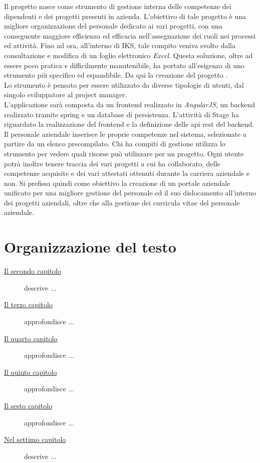 Il progetto \myTitle{} nasce come strumento di gestione interna delle competenze dei dipendenti e dei progetti presenti in azienda. L'obiettivo di tale progetto è una migliore organizzazione del personale dedicato ai vari progetti, con una conseguente maggiore efficienza ed efficacia nell'assegnazione dei ruoli nei processi ed attività. Fino ad ora, all'interno di IKS, tale compito veniva svolto dalla consultazione e modifica di un foglio elettronico \emph{Excel}. Questa soluzione, oltre ad essere poco pratica e difficilmente manutenibile, ha portato all'esigenza di uno strumento più specifico ed espandibile. Da qui la creazione del progetto \myTitle{}.\\
Lo strumento \myTitle{} è pensato per essere utilizzato da diverse tipologie di utenti, dal singolo sviluppatore al project manager.\\
L'applicazione sarà composta da un \gls{frontend} realizzato in \emph{AngularJS}, un \gls{backend} realizzato tramite \gls{spring} e un database di persistenza. L'attività di Stage ha riguardato la realizzazione del frontend e la definizione delle \gls{api} \gls{rest} del backend.\\
Il personale aziendale inserisce le proprie competenze nel sistema, selezionate a partire da un elenco precompilato. 
Chi ha compiti di gestione utilizza lo strumento per vedere quali risorse può utilizzare per un progetto. Ogni utente potrà inoltre tenere traccia dei vari progetti a cui ha collaborato, delle competenze acquisite e dei vari attestati ottenuti durante la carriera aziendale e non.
Si prefissa quindi come obiettivo la creazione di un portale aziendale unificato per una migliore gestione del personale ed il suo dislocamento all’interno dei progetti aziendali, oltre che alla gestione dei curricula vitae del personale aziendale.


\section{Organizzazione del testo}

\begin{description}
    \item[{\hyperref[cap:processi-metodologie]{Il secondo capitolo}}] descrive ...
    
    \item[{\hyperref[cap:descrizione-stage]{Il terzo capitolo}}] approfondisce ...
    
    \item[{\hyperref[cap:analisi-requisiti]{Il quarto capitolo}}] approfondisce ...
    
    \item[{\hyperref[cap:progettazione-codifica]{Il quinto capitolo}}] approfondisce ...
    
    \item[{\hyperref[cap:verifica-validazione]{Il sesto capitolo}}] approfondisce ...
    
    \item[{\hyperref[cap:conclusioni]{Nel settimo capitolo}}] descrive ...
\end{description}

